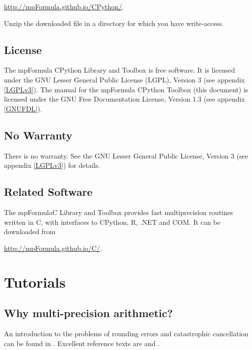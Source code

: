 \vpara
\href{http://mpFormula.github.io/CPython/}{http://mpFormula.github.io/CPython/}. 

\vpara
Unzip the downloaded file in a directory for which you have write-access.





\section{License}
\label{mpFormulaLicense}

The mpFormula CPython Library and Toolbox is free software. It is licensed under the GNU Lesser General Public License (LGPL), Version 3 (see appendix \ref{LGPLv3}).
The manual for the mpFormula CPython Toolbox (this document) is licensed under the GNU Free Documentation License, Version 1.3 (see appendix \ref{GNUFDL}).




\section{No Warranty}
\label{No Warranty} 

There is no warranty. See the GNU  Lesser General Public License, Version 3 (see appendix \ref{LGPLv3}) for details.


\section{Related Software}

The mpFormulaC  Library and Toolbox provides fast multiprecision routines written in C, with interfaces to CPython, R, .NET and COM. It can be downloaded from 

\href{http://mpFormula.github.io/C/}{http://mpFormula.github.io/C/}. 








\chapter{Tutorials}
\label{Tutorials} 

\section{Why multi-precision arithmetic?}
\label{Why multiprecision arithmetic}

An introduction to the problems of rounding errors and catastrophic cancellation can be found in \cite{Goldberg91whatevery}. Excellent reference texts are  \cite{Higham2002} and \cite{Higham2009}.

